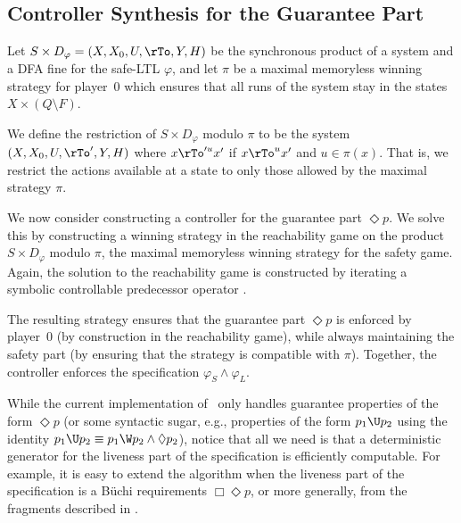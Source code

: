 \subsection{Controller Synthesis for the Guarantee Part}

Let $S\times D_\varphi = (X, X_0, U, \rTo, Y, H) $ be the synchronous product of a system and a
DFA fine for the safe-LTL $\varphi$, and let $\pi$ be a maximal
memoryless winning strategy for player~0 which ensures that all runs of the
system stay in the states $X\times (Q\setminus F)$.

We define the restriction of $S\times D_\varphi$ modulo $\pi$ to be
the system $(X,X_0, U, \rTo', Y, H)$ where $x\rTo'^{u} x'$ if
$x\rTo^{u} x'$ and $u \in \pi(x)$.
That is, we restrict the actions available at a state to only those
allowed by the maximal strategy $\pi$.

We now consider constructing a controller for the guarantee part
$\Diamond p$.
We solve this by constructing a winning strategy in the reachability
game on the product $S\times D_\varphi$ modulo $\pi$, the maximal
memoryless winning strategy for the safety game.
Again, the solution to the reachability game is constructed by
iterating a symbolic controllable predecessor operator
\cite{Zielonka98,MazoDT10}.

The resulting strategy ensures that the guarantee part $\Diamond p$ is
enforced by player~0 (by construction in the reachability game), 
while always maintaining the safety part (by ensuring that the
strategy is compatible with $\pi$).
Together, the controller enforces the specification $\varphi_S \wedge \varphi_L$.




While the current implementation of \tool~only handles guarantee
properties of the form $\Diamond p$ (or some syntactic sugar, e.g.,
properties of the form $p_1 \U p_2$ using the identity $p_1 \U p_2
\equiv p_1\W p_2 \wedge \Diamond p_2$), notice that all we need is
that a deterministic generator for the liveness part of the
specification is efficiently computable.
For example, it is easy to extend the algorithm when the liveness part
of the specification is a B\"uchi requirements $\Box\Diamond p$, or
more generally, from the fragments described in \cite{AlurT04}.
